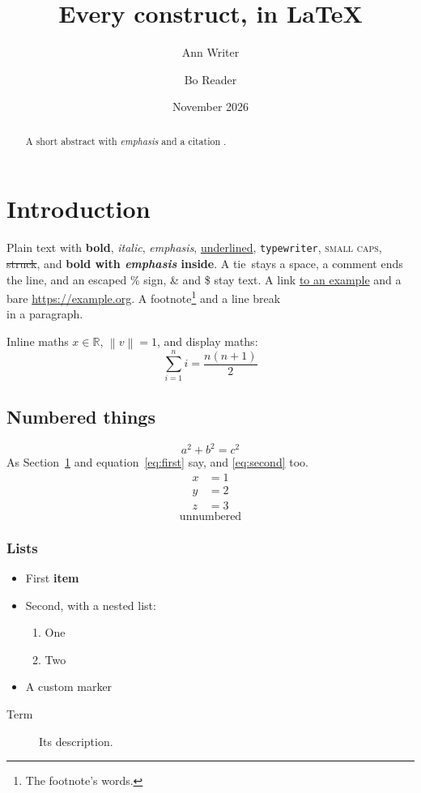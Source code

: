 \documentclass{article}
\title{Every construct, in \LaTeX}
\author{Ann Writer \and Bo Reader}
\date{November 2026}
\newcommand{\R}{\mathbb{R}}
\newcommand{\norm}[1]{\left\lVert #1 \right\rVert}
\begin{document}
\maketitle

\begin{abstract}
A short abstract with \emph{emphasis} and a citation \cite{knuth84}.
\end{abstract}

\section{Introduction}\label{sec:intro}
Plain text with \textbf{bold}, \textit{italic}, \emph{emphasis}, \underline{underlined},
\texttt{typewriter}, \textsc{small caps}, \sout{struck}, and \textbf{bold with \emph{emphasis} inside}.
A tie~stays a space, a comment %
ends the line, and an escaped \% sign, \& and \$ stay text.
A link \href{https://example.com}{to an example} and a bare \url{https://example.org}.
A footnote\footnote{The footnote's words.} and a line break \\ in a paragraph.

Inline maths $x \in \R$, \(\norm{v} = 1\), and display maths:
\[
  \sum_{i=1}^{n} i = \frac{n(n+1)}{2}
\]

\subsection{Numbered things}\label{sec:numbered}
\begin{equation}\label{eq:first}
  a^2 + b^2 = c^2
\end{equation}
As Section~\ref{sec:intro} and equation~\eqref{eq:first} say, and \autoref{eq:second} too.
\begin{align}
  x &= 1 \label{eq:second} \\
  y &= 2 \nonumber \\
  z &= 3
\end{align}
\begin{equation*}
  \text{unnumbered}
\end{equation*}

\subsubsection{Lists}
\begin{itemize}
  \item First \textbf{item}
  \item Second, with a nested list:
  \begin{enumerate}
    \item One
    \item Two \label{item:two}
  \end{enumerate}
  \item[$\star$] A custom marker
\end{itemize}
\begin{description}
  \item[Term] Its description.
\end{description}
\end{document}

